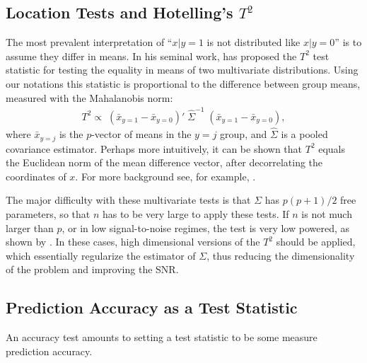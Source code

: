 \documentclass[12pt,a4paper]{article}
\begin{document}
\subsection{Location Tests and Hotelling's $T^2$}
The most prevalent interpretation of ``$x|y=1$ is not distributed like $x|y=0$'' is to assume they differ in means. 
In his seminal work, \citet{hotelling_generalization_1931} has proposed the $T^2$ test statistic for testing the equality in means of two multivariate distributions. 
Using our notations this statistic is proportional to the difference between group means, measured with the Mahalanobis norm: 
\begin{align}
	T^2 \propto \; (\bar{x}_{y=1}-\bar{x}_{y=0})'\; \hat{\Sigma}^{-1} \;(\bar{x}_{y=1}-\bar{x}_{y=0}), 
\end{align}
where $\bar{x}_{y=j}$ is the $p$-vector of means in the $y=j$ group, and $\hat{\Sigma}$ is a pooled covariance estimator.
Perhaps more intuitively, it can be shown that $T^2$ equals the Euclidean norm of the mean difference vector, after decorrelating the coordinates of $x$. 
For more background see, for example, \cite{anderson_introduction_2003}.

The major difficulty with these multivariate tests is that $\Sigma$ has $p(p+1)/2$ free parameters, so that $n$ has to be very large to apply these tests.
If $n$ is not much larger than $p$, or in low signal-to-noise regimes, the test is very low powered, as shown by \cite{bai1996effect}. 
In these cases, high dimensional versions of the $T^2$ should be applied, which essentially regularize the estimator of $\Sigma$, thus reducing the dimensionality of the problem and improving the SNR.



\subsection{Prediction Accuracy as a Test Statistic}
An accuracy test amounts to setting a test statistic to be some measure prediction accuracy.  
\end{document}
